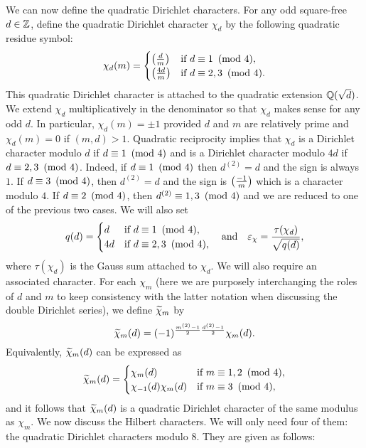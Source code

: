 \documentclass[12pt,reqno,oneside]{amsart}
\begin{document}
    We can now define the quadratic Dirichlet characters. For any odd square-free $d \in \mathbb{Z}$, define the quadratic Dirichlet character $\chi_{d}$ by the following quadratic residue symbol:
    \[
        \chi_{d}(m) = \begin{cases} \left(\frac{d}{m}\right) & \text{if $d \equiv 1 \ \left(\text{mod }4\right)$}, \\ \left(\frac{4d}{m}\right) & \text{if $d \equiv 2,3 \ \left(\text{mod }4\right)$}. \end{cases}
    \]
    This quadratic Dirichlet character is attached to the quadratic extension $\mathbb{Q}(\sqrt{d})$. We extend $\chi_{d}$ multiplicatively in the denominator so that $\chi_{d}$ makes sense for any odd $d$. In particular, $\chi_{d}(m) = \pm1$ provided $d$ and $m$ are relatively prime and $\chi_{d}(m) = 0$ if $(m,d) > 1$. Quadratic reciprocity implies that $\chi_{d}$ is a Dirichlet character modulo $d$ if $d \equiv 1 \ \left(\text{mod }4\right)$ and is a Dirichlet character modulo $4d$ if $d \equiv 2,3 \ \left(\text{mod }4\right)$. Indeed, if $d \equiv 1 \ \left(\text{mod }4\right)$ then $d^{(2)} = d$ and the sign is always $1$. If $d \equiv 3 \ \left(\text{mod }4\right)$, then $d^{(2)} = d$ and the sign is $\textstyle{\left(\frac{-1}{m}\right)}$ which is a character modulo $4$. If $d \equiv 2 \ \left(\text{mod }4\right)$, then $d^{(2)} \equiv 1,3 \ \left(\text{mod }4\right)$ and we are reduced to one of the previous two cases. We will also set
    \[
        q(d) = \begin{cases} d & \text{if $d \equiv 1 \ \left(\text{mod }4\right)$}, \\ 4d & \text{if $d \equiv 2,3 \ \left(\text{mod }4\right)$}, \end{cases} \quad \text{and} \quad \varepsilon_{\chi} = \frac{\tau(\chi_{d})}{\sqrt{q(d)}},
    \]
    where $\tau(\chi_{d})$ is the Gauss sum attached to $\chi_{d}$. We will also require an associated character. For each $\chi_{m}$ (here we are purposely interchanging the roles of $d$ and $m$ to keep consistency with the latter notation when discussing the double Dirichlet series), we define $\widetilde{\chi}_{m}$ by
    \[
        \widetilde{\chi}_{m}(d) = (-1)^{\frac{m^{(2)}-1}{2}\frac{d^{(2)}-1}{2}}\chi_{m}(d).
    \]
    Equivalently, $\widetilde{\chi}_{m}(d)$ can be expressed as
    \[
        \widetilde{\chi}_{m}(d) = \begin{cases} \chi_{m}(d) & \text{if $m \equiv 1,2 \ \left(\text{mod }4\right)$}, \\ \chi_{-1}(d)\chi_{m}(d) & \text{if $m \equiv 3 \ \left(\text{mod }4\right)$}, \end{cases}
    \]
    and it follows that $\widetilde{\chi}_{m}(d)$ is a quadratic Dirichlet character of the same modulus as $\chi_{m}$. We now discuss the Hilbert characters. We will only need four of them: the quadratic Dirichlet characters modulo $8$. They are given as follows:
\end{document}
